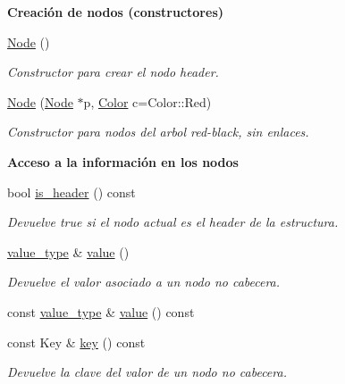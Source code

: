 \begin{Indent}\textbf{ Creación de nodos (constructores)}\par
\begin{DoxyCompactItemize}
\item 
\hyperlink{structaed2_1_1map_1_1Node_a9c1a600491066ce7eb669b1cb76d56c6_a9c1a600491066ce7eb669b1cb76d56c6}{Node} ()
\begin{DoxyCompactList}\small\item\em Constructor para crear el nodo header. \end{DoxyCompactList}\item 
\hyperlink{structaed2_1_1map_1_1Node_a62b5a42e88e219d53af8237a9ebedb6e_a62b5a42e88e219d53af8237a9ebedb6e}{Node} (\hyperlink{structaed2_1_1map_1_1Node}{Node} $\ast$p, \hyperlink{classaed2_1_1map_a6d62a415a4b9d320b30cada4ebcf9f5b_a6d62a415a4b9d320b30cada4ebcf9f5b}{Color} c=Color\+::\+Red)
\begin{DoxyCompactList}\small\item\em Constructor para nodos del arbol red-\/black, sin enlaces. \end{DoxyCompactList}\end{DoxyCompactItemize}
\end{Indent}
\begin{Indent}\textbf{ Acceso a la información en los nodos}\par
\begin{DoxyCompactItemize}
\item 
bool \hyperlink{structaed2_1_1map_1_1Node_ab684678442a3c5f53eb00ed48a9270a9_ab684678442a3c5f53eb00ed48a9270a9}{is\+\_\+header} () const
\begin{DoxyCompactList}\small\item\em Devuelve true si el nodo actual es el header de la estructura. \end{DoxyCompactList}\item 
\hyperlink{classaed2_1_1map_a719db98e0ff9a837610f76be33264680_a719db98e0ff9a837610f76be33264680}{value\+\_\+type} \& \hyperlink{structaed2_1_1map_1_1Node_af4ada8e79dabb4849fc87de63d3970fb_af4ada8e79dabb4849fc87de63d3970fb}{value} ()
\begin{DoxyCompactList}\small\item\em Devuelve el valor asociado a un nodo no cabecera. \end{DoxyCompactList}\item 
const \hyperlink{classaed2_1_1map_a719db98e0ff9a837610f76be33264680_a719db98e0ff9a837610f76be33264680}{value\+\_\+type} \& \hyperlink{structaed2_1_1map_1_1Node_ab66a33cedd0ba5cc20e366d4769184ae_ab66a33cedd0ba5cc20e366d4769184ae}{value} () const
\item 
const Key \& \hyperlink{structaed2_1_1map_1_1Node_a08fd071b9bba8048526b8da7e8d73831_a08fd071b9bba8048526b8da7e8d73831}{key} () const
\begin{DoxyCompactList}\small\item\em Devuelve la clave del valor de un nodo no cabecera. \end{DoxyCompactList}\end{DoxyCompactItemize}
\end{Indent}
